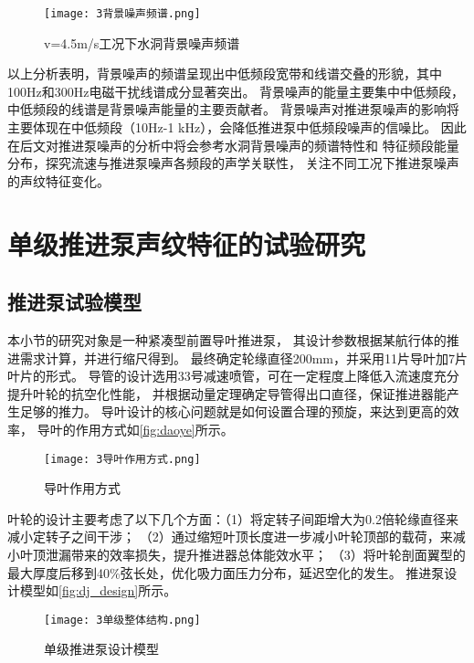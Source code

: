 \begin{figure}[htbp]
    \centering
    \texttt{[image: 3背景噪声频谱.png]}
    \caption{\label{fig:beijingfft}v=4.5m/s工况下水洞背景噪声频谱}
\end{figure}

以上分析表明，背景噪声的频谱呈现出中低频段宽带和线谱交叠的形貌，其中100Hz和300Hz电磁干扰线谱成分显著突出。
背景噪声的能量主要集中中低频段，中低频段的线谱是背景噪声能量的主要贡献者。
背景噪声对推进泵噪声的影响将主要体现在中低频段（10Hz-1 kHz），会降低推进泵中低频段噪声的信噪比。
因此在后文对推进泵噪声的分析中将会参考水洞背景噪声的频谱特性和
特征频段能量分布，探究流速与推进泵噪声各频段的声学关联性，
关注不同工况下推进泵噪声的声纹特征变化。
\section{单级推进泵声纹特征的试验研究}
\subsection{推进泵试验模型}
本小节的研究对象是一种紧凑型前置导叶推进泵，
其设计参数根据某航行体的推进需求计算，并进行缩尺得到。
最终确定轮缘直径200mm，并采用11片导叶加7片叶片的形式。
导管的设计选用33号减速喷管，可在一定程度上降低入流速度充分提升叶轮的抗空化性能，
并根据动量定理确定导管得出口直径，保证推进器能产生足够的推力。
导叶设计的核心问题就是如何设置合理的预旋，来达到更高的效率，
导叶的作用方式如\autoref{fig:daoye}所示。
\begin{figure}[htbp]
    \centering
    \texttt{[image: 3导叶作用方式.png]}
    \caption{\label{fig:daoye}导叶作用方式}
\end{figure}
叶轮的设计主要考虑了以下几个方面：（1）将定转子间距增大为0.2倍轮缘直径来减小定转子之间干涉；
（2）通过缩短叶顶长度进一步减小叶轮顶部的载荷，来减小叶顶泄漏带来的效率损失，提升推进器总体能效水平；
（3）将叶轮剖面翼型的最大厚度后移到40\%弦长处，优化吸力面压力分布，延迟空化的发生。
推进泵设计模型如\autoref{fig:dj_design}所示。
\begin{figure}[htbp]
    \centering
    \texttt{[image: 3单级整体结构.png]}
    \caption{\label{fig:dj_design}单级推进泵设计模型}
\end{figure}

